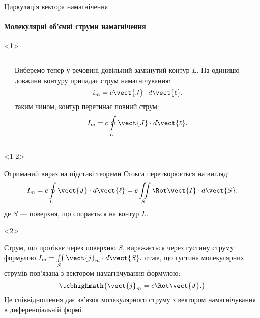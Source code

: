\documentclass{beamer}
\begin{document}
\begin{frame}{Циркуляція вектора намагнічення}{}
	\framesubtitle<2>{Молекулярні об'ємні струми намагнічення}
	\begin{onlyenv}
		\begin{columns}
			\begin{column}{0.5\linewidth}
			\end{column}
			\begin{column}{0.5\linewidth}
				\begin{block}{}\justifying\small
					Виберемо тепер у речовині довільний замкнутий контур {\color{green!50!black}$L$}. На одиницю довжини контуру припадає струм
					намагнічування:
					\begin{equation*}
						i_m = c\vect{J}\cdot d\vect{\ell},
					\end{equation*}
					таким чином,  контур перетинає повний струм:
					\begin{equation*}
						I_m = c\oint\limits_L \vect{J}\cdot d\vect{\ell}.
					\end{equation*}
				\end{block}
			\end{column}
		\end{columns}
	\end{onlyenv}
	\begin{onlyenv}<1-2>
		\begin{block}{}\justifying
			Отриманий вираз на підставі теореми Стокса перетворюється на вигляд:
			\begin{equation*}
				I_m = c\oint\limits_L \vect{J}\cdot d\vect{\ell} = c \iint\limits_S \Rot\vect{I}\cdot d\vect{S}.
			\end{equation*}
			де $S$ --- поверхня, що спирається на контур $L$.
		\end{block}
	\end{onlyenv}
	\begin{onlyenv}
		\begin{block}{}\justifying
			Струм, що протікає через поверхню $S$, виражається через густину струму формулою
			\(
				I_m = \iint\limits_S \vect{j}_m\cdot d\vect{S}.
			\)
			отже, що густина молекулярних струмів пов'язана з вектором намагнічування
			формулою:
			\begin{equation*}
				\tcbhighmath{\vect{j}_m = c\Rot\vect{J}.}
			\end{equation*}
			Це співвідношення дає зв'язок молекулярного струму з вектором намагнічування в диференціальній формі.
		\end{block}
	\end{onlyenv}
\end{frame}
\end{document}
